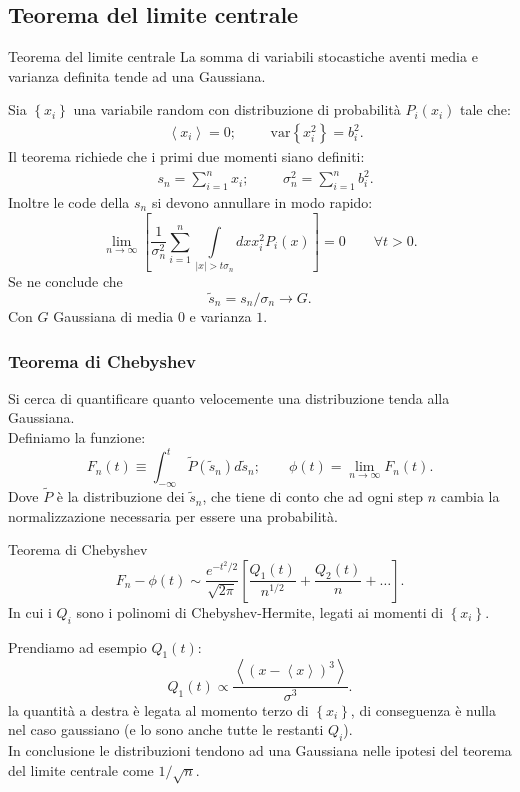 \subsection{Teorema del limite centrale}%
\label{sub:Teorema del limite centrale}
\begin{redbox}{Teorema del limite centrale}
   La somma di variabili stocastiche aventi media e varianza definita tende ad una Gaussiana. 
\end{redbox}
\noindent
Sia $\left\{x_i\right\}$ una variabile random con distribuzione di probabilità $P_i(x_i)$ tale che:
\[\begin{aligned}
    & \left<x_i\right> = 0; &&
    & \text{var}\left\{x_i^2\right\} = b_i^2
.\end{aligned}\]
Il teorema richiede che i primi due momenti siano definiti:
\[\begin{aligned}
    & s_n = \sum_{i=1}^{n} x_i;
    &&
    &\sigma_n^2 = \sum_{i=1}^{n} b_i^2
.\end{aligned}\]
Inoltre le code della $s_n$ si devono annullare in modo rapido:
\[
    \lim_{n \to \infty} 
    \left[\frac{1}{\sigma_n^2} \sum_{i=1}^{n} \int\limits_{\left|x\right|>t\sigma_n}^{} dx x^2_i P_i(x)  \right] 
    = 0 \qquad \forall t>0
.\] 
Se ne conclude che 
\[
    \tilde{s}_n = s_n /\sigma_n \to G
.\] 
Con $G$ Gaussiana di media $0$ e varianza $1$.

\subsubsection{Teorema di Chebyshev}%
\label{subsub:Teorema di Chebyshev}
Si cerca di quantificare quanto velocemente una distribuzione tenda alla Gaussiana.\\
Definiamo la funzione:
\[
    F_n(t) \equiv \int_{-\infty}^{t} \tilde{P}(\tilde{s}_n)d\tilde{s}_n;  \qquad \phi (t) = \lim_{n \to \infty} F_n(t) 
.\] 
Dove $\tilde{P}$ è la distribuzione dei $\tilde{s}_n$, che tiene di conto che ad ogni step $n$ cambia la normalizzazione necessaria per essere una probabilità.
\begin{redbox}{Teorema di Chebyshev}
    \[
	F_n-\phi (t) \sim \frac{e^{-t^2 /2}}{\sqrt{2\pi}}\left[\frac{Q_1(t)}{n^{1 /2}} + \frac{Q_2(t)}{n} + \ldots\right]
    .\] 
    In cui i $Q_i$ sono i polinomi di Chebyshev-Hermite, legati ai momenti di $\left\{x_i\right\}$.
\end{redbox}
\noindent
Prendiamo ad esempio $Q_1(t)$:
\[
    Q_1(t) \propto \frac{\left<\left(x-\left<x\right>\right)^3\right>}{\sigma^3}
.\] 
la quantità a destra è legata al momento terzo di $\left\{x_i\right\}$, di conseguenza è nulla nel caso gaussiano (e lo sono anche tutte le restanti $Q_i$).\\
In conclusione le distribuzioni tendono ad una Gaussiana nelle ipotesi del teorema del limite centrale come $1 / \sqrt{n} $.

